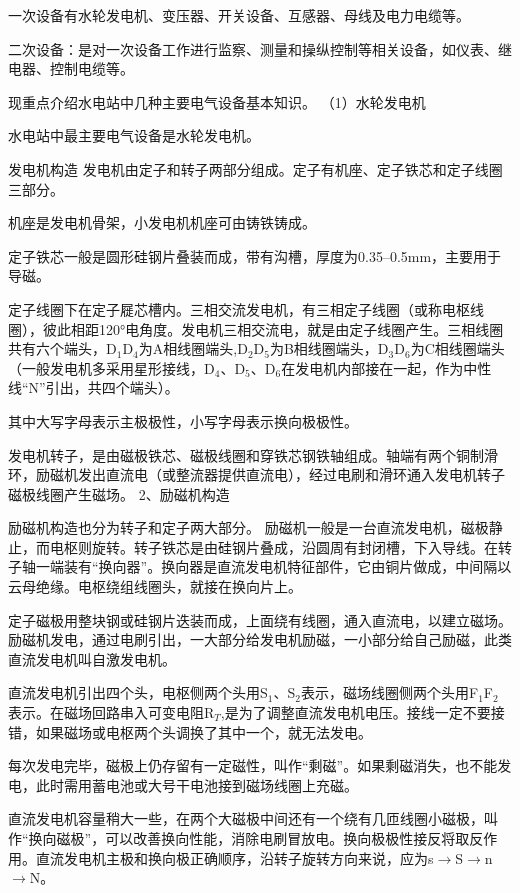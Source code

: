 \documentclass{ctexbook}
\begin{document}
一次设备有水轮发电机、变压器、开关设备、互感器、母线及电力电缆等。

二次设备：是对一次设备工作进行监察、测量和操纵控制等相关设备，如仪表、继电器、控制电缆等。

现重点介绍水电站中几种主要电气设备基本知识。
（1）水轮发电机

水电站中最主要电气设备是水轮发电机。

发电机构造
发电机由定子和转子两部分组成。定子有机座、定子铁芯和定子线圈三部分。

机座是发电机骨架，小发电机机座可由铸铁铸成。

定子铁芯一般是圆形硅钢片叠装而成，带有沟槽，厚度为0.35--0.5mm，主要用于导磁。

定子线圈下在定子屣芯槽内。三相交流发电机，有三相定子线圈（或称电枢线圈），彼此相距120°电角度。发电机三相交流电，就是由定子线圈产生。三相线圈共有六个端头，D$_1$D$_4$为A相线圈端头,D$_2$D$_5$为B相线圈端头，D$_3$D$_6$为C相线圈端头（一般发电机多采用星形接线，D$_4$、D$_5$、D$_6$在发电机内部接在一起，作为中性线“N”引出，共四个端头）。

其中大写字母表示主极极性，小写字母表示换向极极性。

发电机转子，是由磁极铁芯、磁极线圈和穿铁芯钢铁轴组成。轴端有两个铜制滑环，励磁机发出直流电（或整流器提供直流电），经过电刷和滑环通入发电机转子磁极线圈产生磁场。
2、励磁机构造

励磁机构造也分为转子和定子两大部分。
励磁机一般是一台直流发电机，磁极静止，而电枢则旋转。转子铁芯是由硅钢片叠成，沿圆周有封闭槽，下入导线。在转子轴一端装有“换向器”。换向器是直流发电机特征部件，它由铜片做成，中间隔以云母绝缘。电枢绕组线圈头，就接在换向片上。

定子磁极用整块钢或硅钢片迭装而成，上面绕有线圈，通入直流电，以建立磁场。励磁机发电，通过电刷引出，一大部分给发电机励磁，一小部分给自己励磁，此类直流发电机叫自激发电机。

直流发电机引出四个头，电枢侧两个头用S$_1$、S$_2$表示，磁场线圈侧两个头用F$_1$F$_2$表示。在磁场回路串入可变电阻R$_T$,是为了调整直流发电机电压。接线一定不要接错，如果磁场或电枢两个头调换了其中一个，就无法发电。

每次发电完毕，磁极上仍存留有一定磁性，叫作“剩磁”。如果剩磁消失，也不能发电，此时需用蓄电池或大号干电池接到磁场线圈上充磁。

直流发电机容量稍大一些，在两个大磁极中间还有一个绕有几匝线圈小磁极，叫作“换向磁极”，可以改善换向性能，消除电刷冒放电。换向极极性接反将取反作用。直流发电机主极和换向极正确顺序，沿转子旋转方向来说，应为s$\to$S$\to$n$\to$N。
\end{document}
